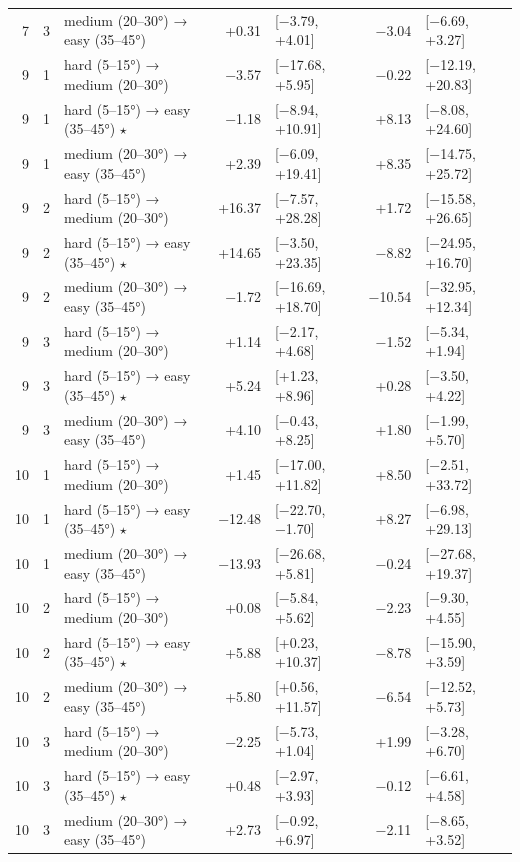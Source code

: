 \begin{table}[htbp]
\begin{tabular}{rllrlrl}
    7 & 3 & medium (20–30°) → easy (35–45°) & +0.31 & [−3.79, +4.01] & −3.04 & [−6.69, +3.27] \\
    9 & 1 & hard (5–15°) → medium (20–30°) & −3.57 & [−17.68, +5.95] & −0.22 & [−12.19, +20.83] \\
    9 & 1 & hard (5–15°) → easy (35–45°) $\star$ & −1.18 & [−8.94, +10.91] & +8.13 & [−8.08, +24.60] \\
    9 & 1 & medium (20–30°) → easy (35–45°) & +2.39 & [−6.09, +19.41] & +8.35 & [−14.75, +25.72] \\
    9 & 2 & hard (5–15°) → medium (20–30°) & +16.37 & [−7.57, +28.28] & +1.72 & [−15.58, +26.65] \\
    9 & 2 & hard (5–15°) → easy (35–45°) $\star$ & +14.65 & [−3.50, +23.35] & −8.82 & [−24.95, +16.70] \\
    9 & 2 & medium (20–30°) → easy (35–45°) & −1.72 & [−16.69, +18.70] & −10.54 & [−32.95, +12.34] \\
    9 & 3 & hard (5–15°) → medium (20–30°) & +1.14 & [−2.17, +4.68] & −1.52 & [−5.34, +1.94] \\
    9 & 3 & hard (5–15°) → easy (35–45°) $\star$ & +5.24 & [+1.23, +8.96] & +0.28 & [−3.50, +4.22] \\
    9 & 3 & medium (20–30°) → easy (35–45°) & +4.10 & [−0.43, +8.25] & +1.80 & [−1.99, +5.70] \\
    10 & 1 & hard (5–15°) → medium (20–30°) & +1.45 & [−17.00, +11.82] & +8.50 & [−2.51, +33.72] \\
    10 & 1 & hard (5–15°) → easy (35–45°) $\star$ & −12.48 & [−22.70, −1.70] & +8.27 & [−6.98, +29.13] \\
    10 & 1 & medium (20–30°) → easy (35–45°) & −13.93 & [−26.68, +5.81] & −0.24 & [−27.68, +19.37] \\
    10 & 2 & hard (5–15°) → medium (20–30°) & +0.08 & [−5.84, +5.62] & −2.23 & [−9.30, +4.55] \\
    10 & 2 & hard (5–15°) → easy (35–45°) $\star$ & +5.88 & [+0.23, +10.37] & −8.78 & [−15.90, +3.59] \\
    10 & 2 & medium (20–30°) → easy (35–45°) & +5.80 & [+0.56, +11.57] & −6.54 & [−12.52, +5.73] \\
    10 & 3 & hard (5–15°) → medium (20–30°) & −2.25 & [−5.73, +1.04] & +1.99 & [−3.28, +6.70] \\
    10 & 3 & hard (5–15°) → easy (35–45°) $\star$ & +0.48 & [−2.97, +3.93] & −0.12 & [−6.61, +4.58] \\
    10 & 3 & medium (20–30°) → easy (35–45°) & +2.73 & [−0.92, +6.97] & −2.11 & [−8.65, +3.52] \\

\end{tabular}
\end{table}
